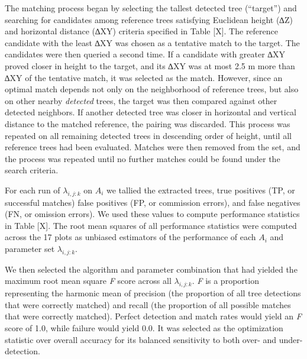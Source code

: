 \documentclass[
  12pt,
]{article}
\begin{document}
The matching process began by selecting the tallest detected tree
(``target'') and searching for candidates among reference trees
satisfying Euclidean height (∆Z) and horizontal distance (∆XY) criteria
specified in Table {[}X{]}. The reference candidate with the least ∆XY
was chosen as a tentative match to the target. The candidates were then
queried a second time. If a candidate with greater ∆XY proved closer in
height to the target, and its ∆XY was at most 2.5 m more than ∆XY of the
tentative match, it was selected as the match. However, since an optimal
match depends not only on the neighborhood of reference trees, but also
on other nearby \emph{detected} trees, the target was then compared
against other detected neighbors. If another detected tree was closer in
horizontal and vertical distance to the matched reference, the pairing
was discarded. This process was repeated on all remaining detected trees
in descending order of height, until all reference trees had been
evaluated. Matches were then removed from the set, and the process was
repeated until no further matches could be found under the search
criteria.

For each run of \(\lambda_{i,j:k}\) on \(A_i\) we tallied the extracted
trees, true positives (TP, or successful matches) false positives (FP,
or commission errors), and false negatives (FN, or omission errors). We
used these values to compute performance statistics in Table {[}X{]}.
The root mean squares of all performance statistics were computed across
the 17 plots as unbiased estimators of the performance of each \(A_i\)
and parameter set \(\lambda_{i,j:k}\).

We then selected the algorithm and parameter combination that had
yielded the maximum root mean square \emph{F} score across all
\(\lambda_{i,j:k}\). \emph{F} is a proportion representing the harmonic
mean of precision (the proportion of all tree detections that were
correctly matched) and recall (the proportion of all possible matches
that were correctly matched). Perfect detection and match rates would
yield an \emph{F} score of 1.0, while failure would yield 0.0. It was
selected as the optimization statistic over overall accuracy for its
balanced sensitivity to both over- and under-detection.
\end{document}
